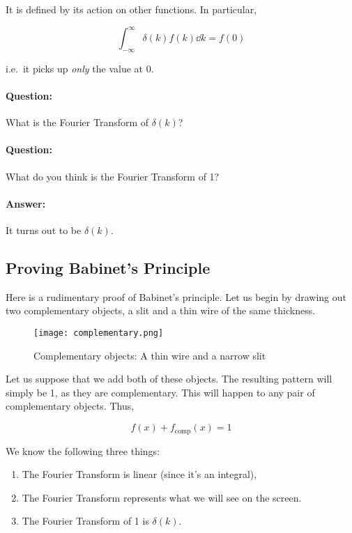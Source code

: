 It is defined by its action on other functions. In particular,

\begin{equation*}
\int_{-\infty}^\infty \delta(k) f(k) \dd k = f(0)
\end{equation*}

i.e.\ it picks up \textit{only} the value at 0.

\begin{tcolorbox}
\paragraph{Question: } What is the Fourier Transform of $\delta(k)$?

\paragraph{Question: } What do you think is the Fourier Transform of 1?
\paragraph{Answer: } It turns out to be $\delta(k)$.
\end{tcolorbox}


\subsection{Proving Babinet's Principle}

Here is a rudimentary proof of Babinet's principle. Let us begin by drawing out two complementary objects, a slit and a thin wire of the same thickness.

\begin{figure}[!htb]
\centering
\texttt{[image: complementary.png]}
\caption{Complementary objects: A thin wire and a narrow slit}
\label{img_complementary}
\end{figure}

Let us suppose that we add both of these objects. The resulting pattern will simply be 1, as they are complementary. This will happen to any pair of complementary objects. Thus,

\begin{equation*}
f(x) + f_\text{comp}(x) = 1
\end{equation*}

We know the following three things:

\begin{enumerate}
\item The Fourier Transform is linear (since it's an integral),
\item The Fourier Transform represents what we will see on the screen.
\item The Fourier Transform of 1 is $\delta(k)$.
\end{enumerate}

